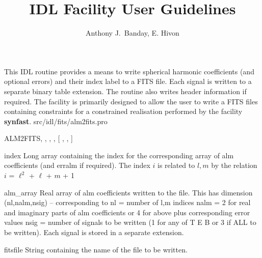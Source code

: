 



\sloppy



\title{\healpix IDL Facility User Guidelines}
 \section[alm2fits]{ }
\label{idl:alm2fits}
\author{Anthony J.~Banday, E. Hivon}




\begin{facility}
{This IDL routine provides a means to write 
spherical harmonic coefficients (and optional errors) and their index label
to a FITS file. Each signal is written to a separate binary table
extension. The routine also writes header information if required.
The facility is primarily designed to allow the user to write 
a FITS files containing constraints for a constrained realisation
performed by the \healpix facility \textbf{synfast}.
}{src/idl/fits/alm2fits.pro}
\end{facility}

\begin{IDLformat}
{ALM2FITS, 
, 
, 
, [%
, 
, 
]}
\end{IDLformat}

\begin{qualifiers}
  \begin{qulist}{} %
    \item[index] Long array containing the index for the corresponding
                 array of alm coefficients (and erralm if required). The
                 index {$i$} is related to {$l,m$} by the relation \hfill\newline
                 $i$ = $\ell^2$ + $\ell$ + $m$ + 1
    \item[alm\_array] Real array of alm coefficients written to the
      file. This has dimension (nl,nalm,nsig) -- corresponding to\hfill\newline
      nl   = number of {l,m} indices \hfill\newline
      nalm = 2 for real and imaginary parts of alm coefficients or
             4 for above plus corresponding error values \hfill\newline
      nsig = number of signals to be written (1 for any of T E B
             or 3 if ALL to be written). Each signal is stored
             in a separate extension.
    \item[fitsfile] String containing the name of the file to be
      written.
  \end{qulist}
\end{qualifiers}

